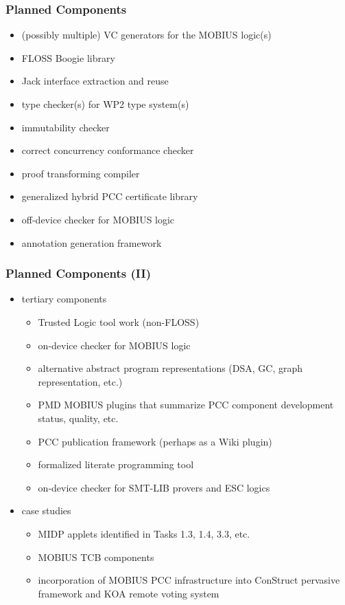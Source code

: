 \documentclass{beamer}
\begin{document}
\begin{frame}\frametitle{Planned Components}
  \begin{itemize}
  \item (possibly multiple) VC generators for the MOBIUS logic(s)
  \item FLOSS Boogie library
  \item Jack interface extraction and reuse
  \item type checker(s) for WP2 type system(s)
  \item immutability checker
  \item correct concurrency conformance checker
  \item proof transforming compiler
  \item generalized hybrid PCC certificate library
  \item off-device checker for MOBIUS logic
  \item annotation generation framework
  \end{itemize}
\end{frame}

\begin{frame}\frametitle{Planned Components (II)}
  \begin{itemize}
  \item tertiary components
    \begin{itemize}
    \item Trusted Logic tool work (non-FLOSS)
    \item on-device checker for MOBIUS logic
    \item alternative abstract program representations (DSA, GC, graph
      representation, etc.)
    \item PMD MOBIUS plugins that summarize PCC component development
      status, quality, etc.
    \item PCC publication framework (perhaps as a Wiki plugin)
    \item formalized literate programming tool
    \item on-device checker for SMT-LIB provers and ESC logics
    \end{itemize}
  \item case studies
    \begin{itemize}
    \item MIDP applets identified in Tasks 1.3, 1.4, 3.3, etc.
    \item MOBIUS TCB components
    \item incorporation of MOBIUS PCC infrastructure into ConStruct
      pervasive framework and KOA remote voting system
    \end{itemize}
  \end{itemize}
\end{frame}
\end{document}
